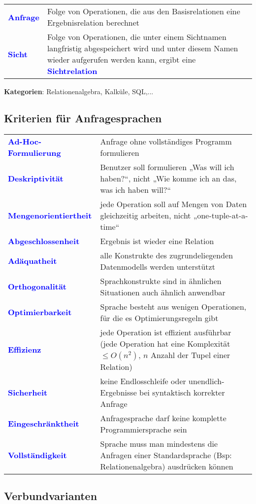 \documentclass{scrartcl}
\newcommand{\key}[1]{{\textcolor{blue}{\textbf{#1}}}}
\begin{document}
\begin{tabular}{lp{13cm}}
	\key{Anfrage} & Folge von Operationen, die aus den Basisrelationen eine Ergebnisrelation berechnet\\
	\key{Sicht} & Folge von Operationen, die unter einem Sichtnamen langfristig abgespeichert wird und unter diesem Namen wieder aufgerufen werden kann, ergibt eine \key{Sichtrelation}\\
\end{tabular}

\textbf{Kategorien}: Relationenalgebra, Kalküle, SQL,...

\subsection{Kriterien für Anfragesprachen}
\begin{tabular}{lp{11cm}}
	\key{Ad-Hoc-Formulierung} & Anfrage ohne vollständiges Programm formulieren \\
	\key{Deskriptivität} & Benutzer soll formulieren „Was will ich haben?“, nicht „Wie komme ich an das, was ich haben will?“ \\
	\key{Mengenorientiertheit} & jede Operation soll auf Mengen von Daten gleichzeitig arbeiten, nicht „one-tuple-at-a-time“ \\
	\key{Abgeschlossenheit} & Ergebnis ist wieder eine Relation\\
	\key{Adäquatheit} & alle Konstrukte des zugrundeliegenden Datenmodells werden unterstützt \\
	\key{Orthogonalität} & Sprachkonstrukte sind in ähnlichen Situationen auch ähnlich anwendbar \\
	\key{Optimierbarkeit} & Sprache besteht aus wenigen Operationen, für die es Optimierungsregeln gibt \\
	\key{Effizienz} & jede Operation ist effizient ausführbar (jede Operation hat eine Komplexität $\leq O(n^2)$, $n$ Anzahl der Tupel einer Relation) \\
	\key{Sicherheit} & keine Endlosschleife oder unendlich-Ergebnisse bei syntaktisch korrekter Anfrage \\
	\key{Eingeschränktheit} & Anfragesprache darf keine komplette Programmiersprache sein \\
	\key{Vollständigkeit} & Sprache muss man mindestens die Anfragen einer Standardsprache (Bsp: Relationenalgebra) ausdrücken können \\
\end{tabular}

\subsection{Verbundvarianten}
\end{document}
